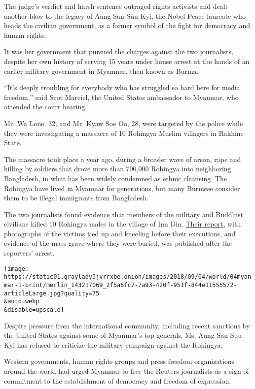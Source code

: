 The judge's verdict and harsh sentence outraged rights activists and
dealt another blow to the legacy of Aung San Suu Kyi, the Nobel Peace
laureate who heads the civilian government, as a former symbol of the
fight for democracy and human rights.

It was her government that pursued the charges against the two
journalists, despite her own history of serving 15 years under house
arrest at the hands of an earlier military government in Myanmar, then
known as Burma.

``It's deeply troubling for everybody who has struggled so hard here for
media freedom,'' said Scot Marciel, the United States ambassador to
Myanmar, who attended the court hearing.

Mr. Wa Lone, 32, and Mr. Kyaw Soe Oo, 28, were targeted by the police
while they were investigating a massacre of 10 Rohingya Muslim villagers
in Rakhine State.

The massacre took place a year ago, during a broader wave of arson, rape
and killing by soldiers that drove more than 700,000 Rohingya into
neighboring Bangladesh, in what has been widely condemned as
\href{https://www.nytimes3xbfgragh.onion/2017/11/22/us/politics/tillerson-myanmar-rohingya-ethnic-cleansing.html}{ethnic
cleansing}. The Rohingya have lived in Myanmar for generations, but many
Burmese consider them to be illegal immigrants from Bangladesh.

The two journalists found evidence that members of the military and
Buddhist civilians killed 10 Rohingya males in the village of Inn Din.
\href{https://www.nytimes3xbfgragh.onion/2018/02/10/world/asia/reuters-myanmar-massacre-rohingya.html}{Their
report,} with photographs of the victims tied up and kneeling before
their executions, and evidence of the mass grave where they were buried,
was published after the reporters' arrest.

\texttt{[image: https://static01.graylady3jvrrxbe.onion/images/2018/09/04/world/04myanmar-1-print/merlin\_143217069\_2f5a6fc7-7a93-420f-951f-844e11555572-articleLarge.jpg?quality=75\\\&auto=webp\\\&disable=upscale]}

Despite pressure from the international community, including recent
sanctions by the United States against some of Myanmar's top generals,
Ms. Aung San Suu Kyi has refused to criticize the military campaign
against the Rohingya.

Western governments, human rights groups and press freedom organizations
around the world had urged Myanmar to free the Reuters journalists as a
sign of commitment to the establishment of democracy and freedom of
expression.

